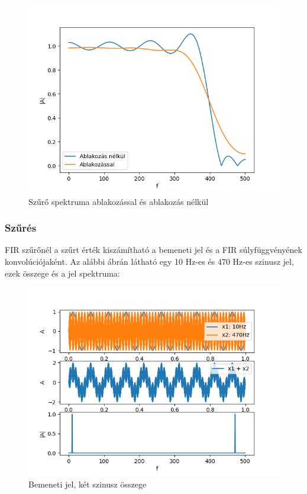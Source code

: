 \begin{figure}[H]
    \centering
    \includegraphics[scale=0.6]{figures/fir_gibbs.png}
    \caption{Szűrő spektruma ablakozással és ablakozás nélkül}
\end{figure}

\subsubsection{Szűrés}

FIR szűrőnél a szűrt érték kiszámítható a bemeneti jel és a FIR súlyfüggvényének konvolúciójaként. Az alábbi ábrán látható egy 10 Hz-es és 470 Hz-es szinusz jel, ezek összege és a jel spektruma:

\begin{figure}[H]
    \centering
    \includegraphics[scale=0.6]{figures/fir_sin.png}
    \caption{Bemeneti jel, két szinusz összege}
\end{figure}

